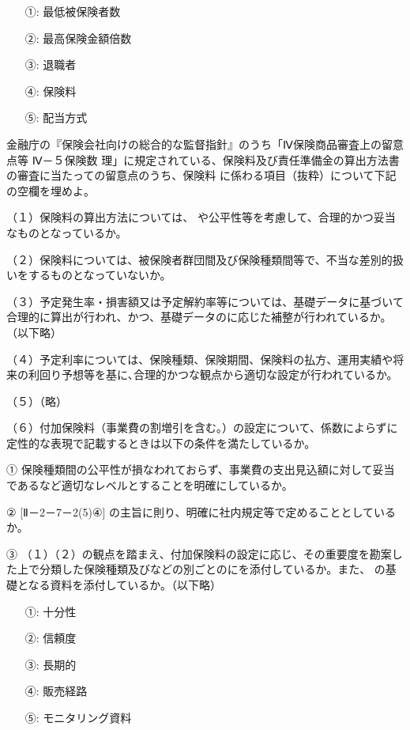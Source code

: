 \documentclass[report,gutter=10mm,fore-edge=10mm,uplatex,dvipdfmx]{jlreq}
\begin{document}
\answer{}
\begin{itemize}
\item[ ①: ] 最低被保険者数
\item[ ②: ] 最高保険金額倍数
\item[ ③: ] 退職者
\item[ ④: ] 保険料
\item[ ⑤: ] 配当方式
\end{itemize}



金融庁の『保険会社向けの総合的な監督指針』のうち「Ⅳ保険商品審査上の留意点等 Ⅳ－５保険数
理」に規定されている、保険料及び責任準備金の算出方法書の審査に当たっての留意点のうち、保険料
に係わる項目（抜粋）について下記の空欄を埋めよ。

（１）保険料の算出方法については、 や公平性等を考慮して、合理的かつ妥当なものとなっているか。

（２）保険料については、被保険者群団間及び保険種類間等で、不当な差別的扱いをするものとなっていないか。

（３）予定発生率・損害額又は予定解約率等については、基礎データに基づいて合理的に算出が行われ、かつ、基礎データのに応じた補整が行われているか。（以下略）

（４）予定利率については、保険種類、保険期間、保険料の払方、運用実績や将来の利回り予想等を基に､合理的かつな観点から適切な設定が行われているか。

（５）（略）

（６）付加保険料（事業費の割増引を含む｡）の設定について、係数によらずに定性的な表現で記載するときは以下の条件を満たしているか。

① 保険種類間の公平性が損なわれておらず、事業費の支出見込額に対して妥当であるなど適切なレベルとすることを明確にしているか。

② [Ⅱ－2－7－2(5)④] の主旨に則り、明確に社内規定等で定めることとしているか。

③ （１）（２）の観点を踏まえ、付加保険料の設定に応じ、その重要度を勘案した上で分類した保険種類及びなどの別ごとのにを添付しているか。また、 の基礎となる資料を添付しているか。（以下略）

\answer{}
\begin{itemize}
\item[ ①:] 十分性
\item[ ②:] 信頼度
\item[ ③:] 長期的
\item[ ④:] 販売経路
\item[ ⑤:] モニタリング資料
\end{itemize}
\end{document}
